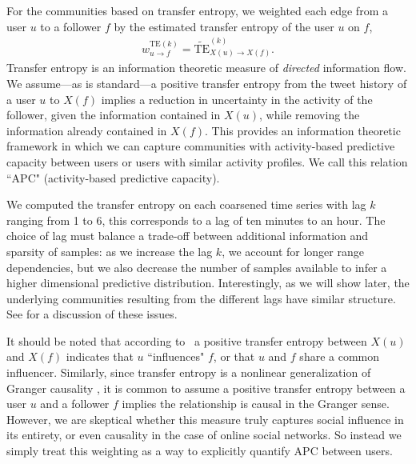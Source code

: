 \documentclass[10pt,letterpaper]{article}
\begin{document}
 For the communities based on transfer entropy, we weighted each edge from a user $u$ to a follower $f$ by the estimated transfer entropy of the user $u$ on $f$, 
\begin{align}
	w_{u \to f}^{\text{TE}(k)} = \widetilde{\text{TE}}_{X(u) \to X(f)}^{(k)}. \label{Eqn-EW-activity}
\end{align}
Transfer entropy is an information theoretic measure of \emph{directed} information flow. We assume---as is standard---a positive transfer entropy from the tweet history of a user $u$ to $X(f)$ implies a reduction in uncertainty in the activity of the follower, given the information contained in $X(u)$, while removing the information already contained in $X(f)$. This provides an information theoretic framework in which we can capture communities with activity-based predictive capacity between users or users with similar activity profiles. We call this relation ``APC" (activity-based predictive capacity). 

 We computed the transfer entropy on each coarsened time series with lag $k$ ranging from 1 to 6, this corresponds to a lag of ten minutes to an hour. The choice of lag must balance a trade-off between additional information and sparsity of samples: as we increase the lag $k$, we account for longer range dependencies, but we also decrease the number of samples available to infer a higher dimensional predictive distribution.  Interestingly, as we will show later, the underlying communities resulting from the different lags have similar structure.  See  for a discussion of these issues.

 

It should be noted that according to~\cite{ver2012information} a positive transfer entropy between $X(u)$ and $X(f)$  indicates that $u$ ``influences" $f$, or that $u$ and $f$ share a common influencer. Similarly, since transfer entropy is a nonlinear generalization of Granger causality \cite{granger1963economic}, it is common to assume a positive transfer entropy between a user $u$ and a follower $f$ implies the relationship is causal in the Granger sense. However, we are skeptical whether this measure truly captures social influence in its entirety, or even causality in the case of online social networks. So instead we simply treat this weighting as a way to explicitly quantify APC between users.
\end{document}
